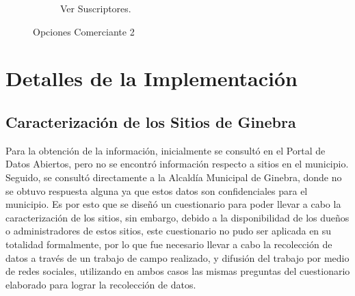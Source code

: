 \documentclass[12pt,letterpaper,openany]{book}
\begin{document}
\begin{figure}[H]
\begin{subfigure}{.4\linewidth}
        \caption{Ver Suscriptores.}
    \end{subfigure}
    \caption{Opciones Comerciante 2}
\end{figure}

\section{Detalles de la Implementación}
\subsection{Caracterización de los Sitios de Ginebra}
Para la obtención de la información, inicialmente se consultó en el Portal de Datos Abiertos, pero no se encontró información respecto a sitios en el municipio. Seguido, se consultó directamente a la Alcaldía Municipal de Ginebra, donde no se obtuvo respuesta alguna ya que estos datos son confidenciales para el municipio. Es por esto que se diseñó un cuestionario para poder llevar a cabo la caracterización de los sitios, sin embargo, debido a la disponibilidad de los dueños o administradores de estos sitios, este cuestionario no pudo ser aplicada en su totalidad formalmente, por lo que fue necesario llevar a cabo la recolección de datos a través de un trabajo de campo realizado, y difusión del trabajo por medio de redes sociales, utilizando en ambos casos las mismas preguntas del cuestionario elaborado para lograr la recolección de datos.
\end{document}
